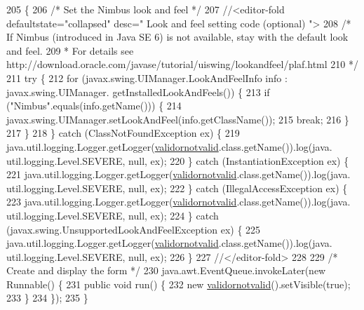\begin{DoxyCode}
205                                            \{
206         \textcolor{comment}{/* Set the Nimbus look and feel */}
207         \textcolor{comment}{//<editor-fold defaultstate="collapsed" desc=" Look and feel setting code (optional) ">}
208         \textcolor{comment}{/* If Nimbus (introduced in Java SE 6) is not available, stay with the default look and feel.}
209 \textcolor{comment}{         * For details see http://download.oracle.com/javase/tutorial/uiswing/lookandfeel/plaf.html }
210 \textcolor{comment}{         */}
211         \textcolor{keywordflow}{try} \{
212             \textcolor{keywordflow}{for} (javax.swing.UIManager.LookAndFeelInfo info : javax.swing.UIManager.
      getInstalledLookAndFeels()) \{
213                 \textcolor{keywordflow}{if} (\textcolor{stringliteral}{"Nimbus"}.equals(info.getName())) \{
214                     javax.swing.UIManager.setLookAndFeel(info.getClassName());
215                     \textcolor{keywordflow}{break};
216                 \}
217             \}
218         \} \textcolor{keywordflow}{catch} (ClassNotFoundException ex) \{
219             java.util.logging.Logger.getLogger(\mbox{\hyperlink{classsoftware_1_1validornotvalid_af537676fcb9f27ef30b7c7375f4f46f9}{validornotvalid}}.class.getName()).log(java.
      util.logging.Level.SEVERE, null, ex);
220         \} \textcolor{keywordflow}{catch} (InstantiationException ex) \{
221             java.util.logging.Logger.getLogger(\mbox{\hyperlink{classsoftware_1_1validornotvalid_af537676fcb9f27ef30b7c7375f4f46f9}{validornotvalid}}.class.getName()).log(java.
      util.logging.Level.SEVERE, null, ex);
222         \} \textcolor{keywordflow}{catch} (IllegalAccessException ex) \{
223             java.util.logging.Logger.getLogger(\mbox{\hyperlink{classsoftware_1_1validornotvalid_af537676fcb9f27ef30b7c7375f4f46f9}{validornotvalid}}.class.getName()).log(java.
      util.logging.Level.SEVERE, null, ex);
224         \} \textcolor{keywordflow}{catch} (javax.swing.UnsupportedLookAndFeelException ex) \{
225             java.util.logging.Logger.getLogger(\mbox{\hyperlink{classsoftware_1_1validornotvalid_af537676fcb9f27ef30b7c7375f4f46f9}{validornotvalid}}.class.getName()).log(java.
      util.logging.Level.SEVERE, null, ex);
226         \}
227         \textcolor{comment}{//</editor-fold>}
228 
229         \textcolor{comment}{/* Create and display the form */}
230         java.awt.EventQueue.invokeLater(\textcolor{keyword}{new} Runnable() \{
231             \textcolor{keyword}{public} \textcolor{keywordtype}{void} run() \{
232                 \textcolor{keyword}{new} \mbox{\hyperlink{classsoftware_1_1validornotvalid_af537676fcb9f27ef30b7c7375f4f46f9}{validornotvalid}}().setVisible(\textcolor{keyword}{true});
233             \}
234         \});
235     \}
\end{DoxyCode}


